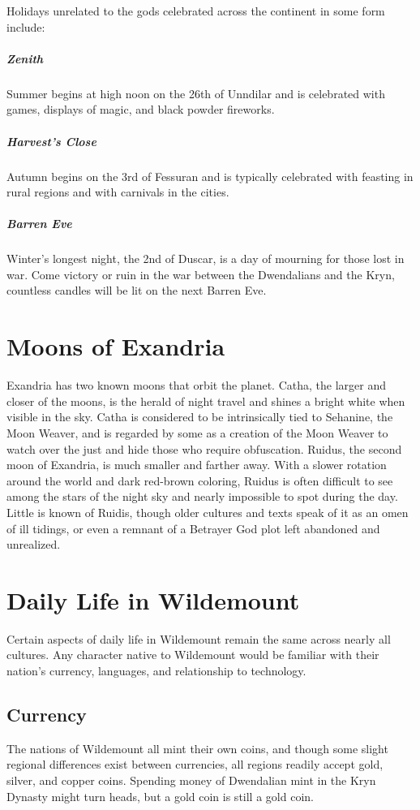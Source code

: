 \documentclass[10pt,a4paper,twoside,bg=print,twocolumn,openany,nodeprecatedcode]{dndbook}
\begin{document}
Holidays unrelated to the gods celebrated across the continent in some form include:

\subparagraph{Zenith}
Summer begins at high noon on the 26th of Unndilar and is celebrated with games, displays of magic, and black powder fireworks.

\subparagraph{Harvest's Close}
Autumn begins on the 3rd of Fessuran and is typically celebrated with feasting in rural regions and with carnivals in the cities.

\subparagraph{Barren Eve}
Winter's longest night, the 2nd of Duscar, is a day of mourning for those lost in war. Come victory or ruin in the war between the Dwendalians and the Kryn, countless candles will be lit on the next Barren Eve.

\section{Moons of Exandria}
Exandria has two known moons that orbit the planet. Catha, the larger and closer of the moons, is the herald of night travel and shines a bright white when visible in the sky. Catha is considered to be intrinsically tied to Sehanine, the Moon Weaver, and is regarded by some as a creation of the Moon Weaver to watch over the just and hide those who require obfuscation. Ruidus, the second moon of Exandria, is much smaller and farther away. With a slower rotation around the world and dark red-brown coloring, Ruidus is often difficult to see among the stars of the night sky and nearly impossible to spot during the day. Little is known of Ruidis, though older cultures and texts speak of it as an omen of ill tidings, or even a remnant of a Betrayer God plot left abandoned and unrealized.

\section{Daily Life in Wildemount}
Certain aspects of daily life in Wildemount remain the same across nearly all cultures. Any character native to Wildemount would be familiar with their nation's currency, languages, and relationship to technology.

\subsection{Currency}
The nations of Wildemount all mint their own coins, and though some slight regional differences exist between currencies, all regions readily accept gold, silver, and copper coins. Spending money of Dwendalian mint in the Kryn Dynasty might turn heads, but a gold coin is still a gold coin.
\end{document}
